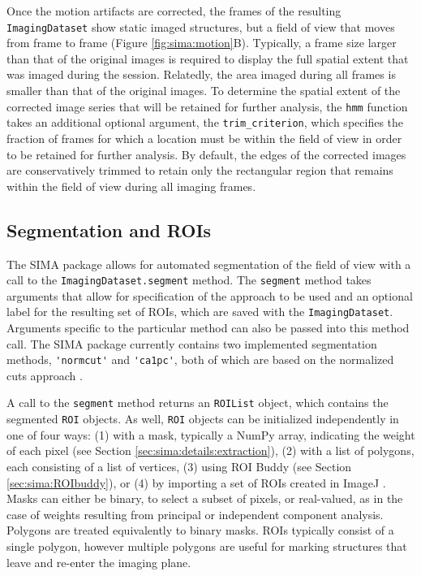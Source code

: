 Once the motion artifacts are corrected, the frames of the resulting \verb|ImagingDataset| show static
imaged structures, but a field of view that moves from frame to frame (Figure \ref{fig:sima:motion}B).
Typically, a frame size larger than that of the original images is required to display
the full spatial extent that was imaged during the session.
Relatedly, the area imaged during all frames is smaller than that of the original
images.
To determine the spatial extent of the corrected image series that will be
retained for further analysis, the \verb|hmm| function takes an additional
optional argument, 
the \verb|trim_criterion|, which specifies the fraction of frames for which
a location must be within the field of view in order to be retained for further
analysis.
By default, the edges of the corrected images are conservatively trimmed to retain
only the rectangular region that remains within the field of view during all imaging frames.


\subsection{Segmentation and ROIs}\label{sec:sima:ROIs}
The SIMA package allows for automated segmentation of the field of view with a call to the \verb|ImagingDataset.segment|
method.
The \verb|segment| method takes arguments that allow for specification of the approach
to be used and an optional label for the resulting set of ROIs, which are saved
with the \verb|ImagingDataset|.
Arguments specific to the particular method can also be passed into this
method call.
The SIMA package currently contains two implemented segmentation methods,
\verb|'normcut'| and \verb|'ca1pc'|, 
both of which are based on the normalized cuts approach \citep{Shi2000}.

A call to the \verb|segment| method returns an \verb|ROIList| object,
which contains the segmented \verb|ROI| objects.
As well, \verb|ROI| objects can be initialized independently in one of four ways: 
(1) with a mask, typically a NumPy array, indicating the weight of each pixel (see Section \ref{sec:sima:details:extraction}),
(2) with a list of polygons, each consisting of a list of vertices,
(3) using ROI Buddy (see Section \ref{sec:sima:ROIbuddy}), or
(4) by importing a set of ROIs created in ImageJ \citep{Schneider2012}.
Masks can either be binary, to select a subset of pixels, or real-valued, as in the case of
weights resulting from principal or independent component analysis.
Polygons are treated equivalently to binary masks.
ROIs typically consist of a single polygon, however multiple polygons are useful
for marking structures that leave and re-enter the imaging plane.

